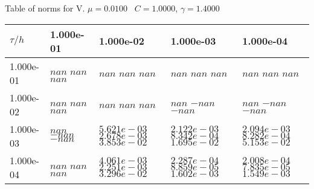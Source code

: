 \begin{center}
Table of norms for V. $\mu = 0.0100$ \, $C = 1.0000$, $\gamma = 1.4000$
  
\begin{tabular}{|p{1in}|p{1in}|p{1in}|p{1in}|p{1in}|} \hline
$\tau / h$ &1.000e-01 &1.000e-02 &1.000e-03 &1.000e-04 \\ \hline 
1.000e-01 & $nan$  $nan$  $nan$  & $nan$  $nan$  $nan$  & $nan$  $nan$  $nan$  & $nan$  $nan$  $nan$  \\ \hline 
1.000e-02 & $nan$  $nan$  $nan$  & $nan$  $nan$  $nan$  & $nan$  $-nan$  $-nan$  & $nan$  $-nan$  $-nan$  \\ \hline 
1.000e-03 & $nan$  $-nan$  $-nan$  & $5.621e-03$  $2.678e-03$  $3.853e-02$  & $2.122e-03$  $8.342e-04$  $1.695e-02$  & $2.094e-03$  $8.282e-04$  $5.153e-02$  \\ \hline 
1.000e-04 & $nan$  $nan$  $nan$  & $4.061e-03$  $2.251e-03$  $3.296e-02$  & $2.287e-04$  $8.859e-05$  $1.602e-03$  & $2.008e-04$  $7.835e-05$  $1.549e-03$  \\ \hline 

\end{tabular}\\[20pt]
\end{center}
